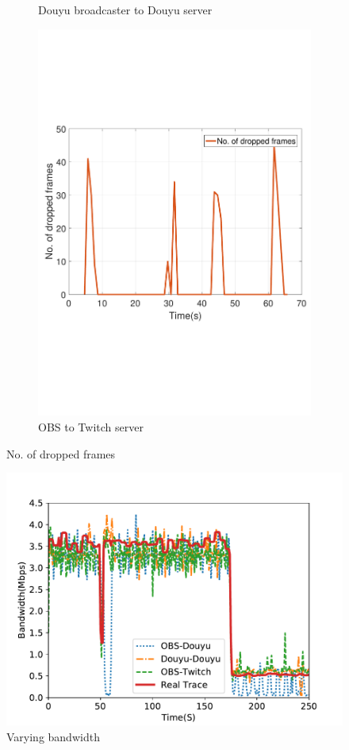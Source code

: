 \begin{figure}[htb]
\begin{subfigure}[b]{0.32\textwidth}
  \caption{Douyu broadcaster to Douyu server}
  \label{fig:douyu-drop}
\end{subfigure}
\begin{subfigure}[b]{0.32\textwidth}%
  \includegraphics[width=0.8\linewidth]{fig/obs_twitch_drop.pdf}
  \caption{OBS to Twitch server}
  \label{fig:obs-twitch-drop}
\end{subfigure}
\caption{No. of dropped frames}\label{fig:commerical-drop}
\end{figure}

\begin{figure}[htb]
\centering
\includegraphics[width=.7\columnwidth]{fig/vary-bandwidth.pdf}
\caption{Varying bandwidth}
\label{fig:vary-bandwidth}
\end{figure}

